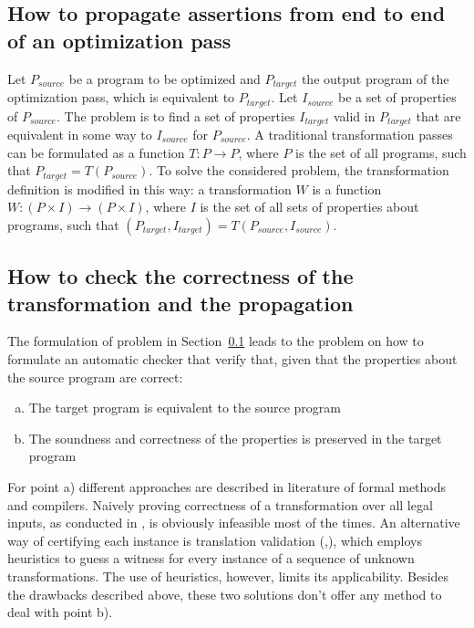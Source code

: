\subsection{How to propagate assertions from end to end of an optimization pass}
\label{sub:how_to_propagate_assertions}
Let $P_{{source}}$ be a program to be optimized and $P_{target}$ the output program of the optimization pass, which is equivalent to $P_{target}$. Let $I_{{source}}$ be a set of properties of $P_{source}$. The problem is to find a set of properties $I_{target}$ valid in $P_{target}$ that are equivalent in some way to $I_{source}$ for $P_{source}$. A traditional transformation passes can be formulated as a function $T:P \rightarrow P$, where $P$ is the set of all programs, such that $P_{target}=T(P_{source})$. To solve the considered problem, the transformation definition is modified in this way: a transformation $W$ is a function $W:(P \times I) \rightarrow (P \times I)$, where $I$ is the set of all sets of properties about programs, such that $(P_{target},I_{target})=T(P_{source},I_{source})$.

\subsection{How to check the correctness of the transformation and the propagation}
\label{sub:how_to_check_the_correctness}
The formulation of problem in Section~\ref{sub:how_to_propagate_assertions} leads to the problem on how to formulate an automatic checker that verify that, given that the properties about the source program are correct:
\begin{enumerate}[a)]
  \item The target program is equivalent to the source program
  \item The soundness and correctness of the properties is preserved in the target program
\end{enumerate}

For point a) different approaches are described in literature of formal methods and compilers. Naively proving correctness of a transformation over all legal inputs, as conducted in \cite{leroy2006formal}, is obviously infeasible most of the times. An alternative way of certifying each instance is translation validation (\cite{zuck2005translation},\cite{barrett2005tvoc}), which employs heuristics to guess a witness for every instance of a sequence of unknown transformations. The use of heuristics, however, limits its applicability. Besides the drawbacks described above, these two solutions don't offer any method to deal with point b).

